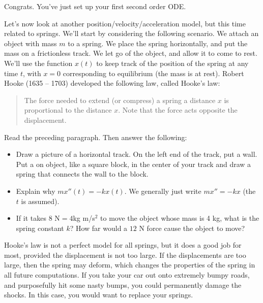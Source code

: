 Congrats.  You've just set up your first second order ODE. 

Let's now look at another position/velocity/acceleration model, but this time related to springs. 
We'll start by considering the following scenario. We attach an object with mass $m$ to a spring.  
We place the spring horizontally, and put the mass on a frictionless track. We let go of the object, and allow it to come to rest. We'll use the function $x(t)$ to keep track of the position of the spring at any time $t$, with $x=0$ corresponding to equilibrium (the mass is at rest). Robert Hooke (1635 -- 1703) developed the following law, called Hooke's law:
\begin{quote}
 The force needed to extend (or compress) a spring a distance $x$ is proportional to the distance $x$. Note that the force acts opposite the displacement.
\end{quote}
\begin{problem}
 Read the preceding paragraph.  Then answer the following:
\begin{itemize}
 \item Draw a picture of a horizontal track. On the left end of the track, put a wall. Put a on object, like a square block, in the center of your track and draw a spring that connects the wall to the block.
 \item Explain why $mx''(t)=-kx(t)$. We generally just write $mx''=-kx$ (the $t$ is assumed).  
 \item If it takes $8 \text{ N} = 4$kg m/s$^2$ to move the object whose mass is 4 kg, what is the spring constant $k$?  How far would a $12$ N force cause the object to move?
\end{itemize}
\end{problem}

Hooke's law is not a perfect model for all springs, but it does a good job for most, provided the displacement is not too large.  If the displacements are too large, then the spring may deform, which changes the properties of the spring in all future computations.  If you take your car out onto extremely bumpy roads, and purposefully hit some nasty bumps, you could permanently damage the shocks. In this case, you would want to replace your springs.

